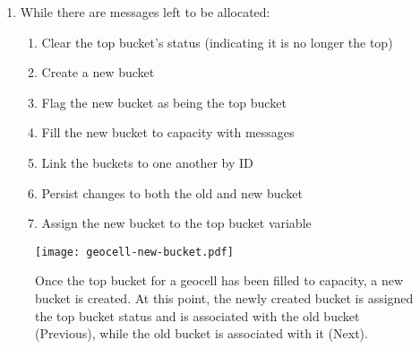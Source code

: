 \documentclass{article}
\begin{document}
\begin{description}
\begin{enumerate}
		\item
		{
			While there are messages left to be allocated:
			
			\begin{enumerate}
				\item Clear the top bucket's status (indicating it is no longer the top)
				\item Create a new bucket
				\item Flag the new bucket as being the top bucket
				\item Fill the new bucket to capacity with messages
				\item Link the buckets to one another by ID 
				\item Persist changes to both the old and new bucket
				\item Assign the new bucket to the top bucket variable
			\end{enumerate}
		}
	\end{enumerate}

\end{description}

\begin{figure}
\begin{center}
\texttt{[image: geocell-new-bucket.pdf]}
\caption{Once the top bucket for a geocell has been filled to capacity, a new bucket is created. At this point, the newly created bucket is assigned the top bucket status and is associated with the old bucket (Previous), while the old bucket is associated with it (Next).}
\label{fig:geocell_new_bucket}
\end{center}
\end{figure}
\end{document}
